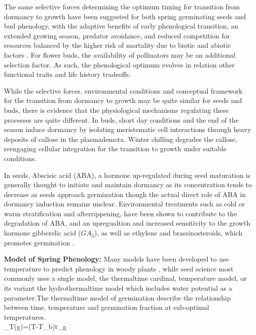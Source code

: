 \documentclass{article}\usepackage[]{graphicx}\usepackage[]{color}
\begin{document}
\par The same selective forces determining the optimum timing for transition from dormancy to growth have been suggested for both spring germinating seeds and bud phenology, with the adaptive benefits of early phenological transition, an extended growing season, predator avoidance, and reduced competition for resources balanced by the higher risk of mortality due to biotic and abiotic factors \citep{Rathcke1985}. For flower buds, the availability of pollinators may be an additional selection factor. As such, the phenological optimum evolves in relation other functional traits and life history tradeoffs. 
\par While the selective forces, environmental conditions and conceptual framework for the transition from dormancy to growth may be quite similar for seeds and buds, there is evidence that the physiological mechanisms regulating these processes are quite different. In buds, short day conditions and the end of the season induce dormancy by isolating meristematic cell interactions through heavy deposits of callose in the plasmademota\citep{Rinne2011,Sager2014}. Winter chilling degrades the callose, reengaging cellular integration for the transition to growth under suitable conditions. 
\par In seeds, Abscisic acid (ABA), a hormone up-regulated during seed maturation is generally thought to initiate and maintain dormancy as its concentration tends to decrease as seeds approach germination  though the actual direct role of ABA in dormancy induction remains unclear. Environmental treatments such as cold or warm stratification and afterrippening, have been shown to contribute to the degradation of ABA, and an upregualtion and increased sensitivity to the growth hormone gibberelic acid ($GA_3$), as well as ethylene and brassinosteroids, which promotes germination \citep{Kucera2005}.

\textbf{Model of Spring Phenology:} Many models have been developed to use temperature to predict phenology in woody plants \citep{Chuine2002}, while seed science most commonly uses a single model, the thermaltime cardinal, temperature model, or its variant the hydrothermaltime model which includes water potential as a parameter\citep{Bradford2002}.The thermaltime model of germination describe the relationship between time, temperature and germination fraction at sub-optimal temperatures.\\

\theta_{T}(g)=(T-T_{b})t_{g}\\
\end{document}
